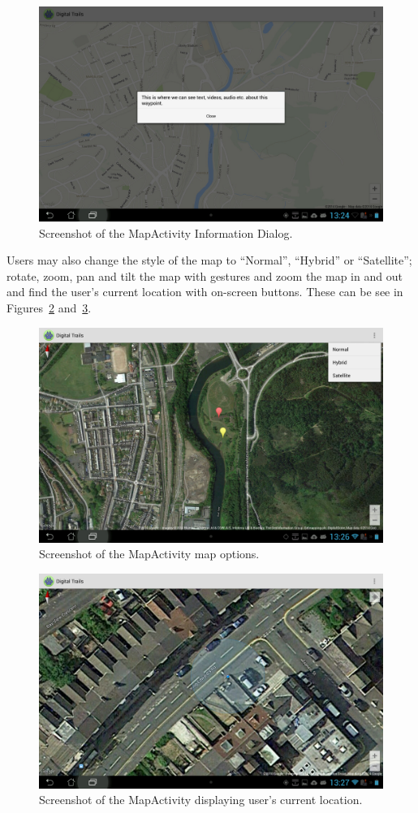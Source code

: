\documentclass[11pt,a4paper]{article}
\begin{document}
\begin{figure}[H]
\centering
\includegraphics[width=.7\linewidth]{wpInfoDialog.jpg}
\caption{Screenshot of the MapActivity Information Dialog.}
\label{fig:wpInfoDialog}
\end{figure}

Users may also change the style of the map to ``Normal'', ``Hybrid'' or ``Satellite''; rotate, zoom, pan and tilt the map with gestures and zoom the map in and out and find the user's current location with on-screen buttons. These can be see in Figures~\ref{fig:mapOptions} and~\ref{fig:userLocation}.

\begin{figure}[H]
\centering
\includegraphics[width=.7\linewidth]{mapOptions.jpg}

\caption{Screenshot of the MapActivity map options.}
\label{fig:mapOptions}
\end{figure}

\begin{figure}[H]
\centering
\includegraphics[width=.7\linewidth]{userLocation.jpg}

\caption{Screenshot of the MapActivity displaying user's current location.}
\label{fig:userLocation}
\end{figure}
\end{document}
